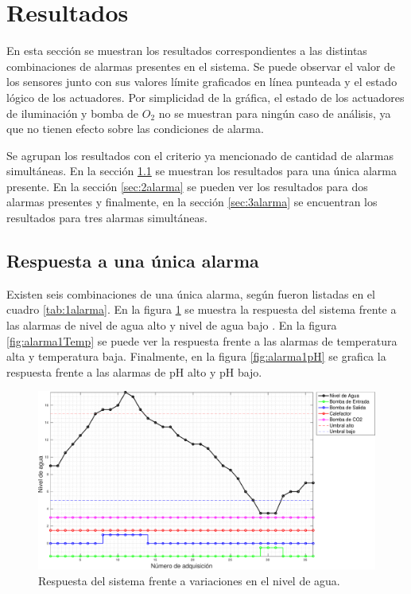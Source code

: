 \clearpage
\section{Resultados}
\label{sec:Resultados}

En esta sección se muestran los resultados correspondientes a las distintas combinaciones de alarmas presentes en el sistema.  Se puede observar el valor de los sensores junto con sus valores límite graficados en línea punteada y el estado lógico de los actuadores.  Por simplicidad de la gráfica, el estado de los actuadores de iluminación y bomba de $O_2$ no se muestran para ningún caso de análisis, ya que no tienen efecto sobre las condiciones de alarma.

Se agrupan los resultados con el criterio ya mencionado de cantidad de alarmas simultáneas.  En la sección \ref{sec:1alarma} se muestran los resultados para una única alarma presente. En la sección \ref{sec:2alarma} se pueden ver los resultados para dos alarmas presentes y finalmente, en la sección \ref{sec:3alarma} se encuentran los resultados para tres alarmas simultáneas.

\subsection{Respuesta a una única alarma}
\label{sec:1alarma}
Existen seis combinaciones de una única alarma, según fueron listadas en el cuadro \ref{tab:1alarma}. En la figura \ref{fig:alarma1nivel} se muestra la respuesta del sistema frente a las alarmas de nivel de agua alto y nivel de agua bajo . En la figura \ref{fig:alarma1Temp} se puede ver la respuesta frente a las alarmas de temperatura alta y temperatura baja. Finalmente, en la figura \ref{fig:alarma1pH} se grafica la respuesta frente a las alarmas de pH alto y pH bajo.

\begin{figure}[h]
\centering
    \includegraphics[width=\textwidth]{./Figures/plot1Water.pdf}
	\caption{Respuesta del sistema frente a variaciones en el nivel de agua.}
	\label{fig:alarma1nivel}
\end{figure}

